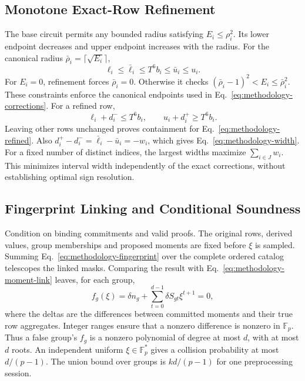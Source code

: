 \subsection{Monotone Exact-Row Refinement}
The base circuit permits any bounded radius satisfying $E_i\leq\rho_i^2$.
Its lower endpoint decreases and upper endpoint increases with the radius.
For the canonical radius $\bar\rho_i=\lceil\sqrt{E_i}\rceil$,
\begin{equation}
 \ell_i\leq\bar\ell_i\leq T^6b_i\leq\bar u_i\leq u_i.
\end{equation}
For $E_i=0$, refinement forces $\bar\rho_i=0$. Otherwise it checks
$(\bar\rho_i-1)^2<E_i\leq\bar\rho_i^2$. These constraints enforce the
canonical endpoints used in Eq.~\eqref{eq:methodology-corrections}.
For a refined row,
\begin{equation}
 \ell_i+d_i^-\leq T^6b_i,
 \qquad u_i+d_i^+\geq T^6b_i.
\end{equation}
Leaving other rows unchanged proves containment for
Eq.~\eqref{eq:methodology-refined}. Also
$d_i^+-d_i^-=\bar\ell_i-\bar u_i=-w_i$, which gives
Eq.~\eqref{eq:methodology-width}. For a fixed number of distinct indices,
the largest widths maximize $\sum_{i\in J}w_i$. This minimizes interval
width independently of the exact corrections, without establishing optimal
sign resolution.

\subsection{Fingerprint Linking and Conditional Soundness}
Condition on binding commitments and valid proofs. The original rows,
derived values, group memberships and proposed moments are fixed before
$\xi$ is sampled. Summing Eq.~\eqref{eq:methodology-fingerprint} over the
complete ordered catalog telescopes the linked masks. Comparing the result
with Eq.~\eqref{eq:methodology-moment-link} leaves, for each group,
\begin{equation}
 f_g(\xi)=\delta n_g+\sum_{t=0}^{d-1}\delta S_{gt}\xi^{t+1}=0,
\end{equation}
where the deltas are the differences between committed moments and their
true row aggregates. Integer ranges ensure that a nonzero difference is
nonzero in $\mathbb F_p$. Thus a false group's $f_g$ is a nonzero polynomial
of degree at most $d$, with at most $d$ roots. An independent uniform
$\xi\in\mathbb F_p^*$ gives a collision probability at most $d/(p-1)$.
The union bound over groups is $kd/(p-1)$ for one preprocessing session.

